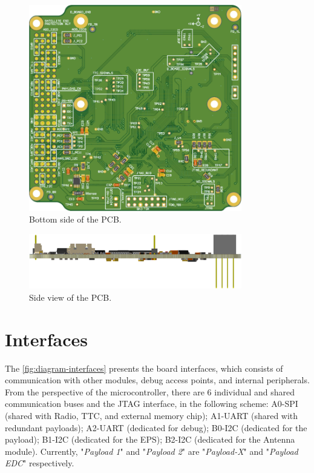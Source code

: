 \begin{figure}[!ht]
    \begin{center}
        \includegraphics[width=93mm]{figures/obdh2-pcb-bottom.png}
        \caption{Bottom side of the PCB.}
        \label{fig:pcb-bottom}
    \end{center}
\end{figure}

\begin{figure}[!ht]
    \begin{center}
        \includegraphics[width=93mm]{figures/obdh2-pcb-side.png}
        \caption{Side view of the PCB.}
        \label{fig:pcb-side}
    \end{center}
\end{figure}


\section{Interfaces}

The \autoref{fig:diagram-interfaces} presents the board interfaces, which consists of communication with other modules, debug access points, and internal peripherals. From the perspective of the microcontroller, there are 6 individual and shared communication buses and the JTAG interface, in the following scheme: A0-SPI (shared with Radio, TTC, and external memory chip); A1-UART (shared with redundant payloads); A2-UART (dedicated for debug); B0-I2C (dedicated for the payload); B1-I2C (dedicated for the EPS); B2-I2C (dedicated for the Antenna module). Currently, "\textit{Payload 1}" and "\textit{Payload 2}" are "\textit{Payload-X}" and "\textit{Payload EDC}" respectively.

